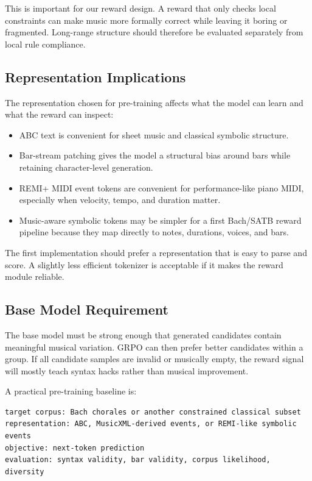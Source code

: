 \documentclass[11pt]{article}
\begin{document}
This is important for our reward design. A reward that only checks local
constraints can make music more formally correct while leaving it boring or
fragmented. Long-range structure should therefore be evaluated separately from
local rule compliance.

\subsection{Representation Implications}

The representation chosen for pre-training affects what the model can learn and
what the reward can inspect:

\begin{itemize}[leftmargin=*]
  \item ABC text is convenient for sheet music and classical symbolic structure.
  \item Bar-stream patching gives the model a structural bias around bars while
  retaining character-level generation.
  \item REMI+ MIDI event tokens are convenient for performance-like piano MIDI,
  especially when velocity, tempo, and duration matter.
  \item Music-aware symbolic tokens may be simpler for a first Bach/SATB reward
  pipeline because they map directly to notes, durations, voices, and bars.
\end{itemize}

The first implementation should prefer a representation that is easy to parse and
score. A slightly less efficient tokenizer is acceptable if it makes the reward
module reliable.

\subsection{Base Model Requirement}

The base model must be strong enough that generated candidates contain meaningful
musical variation. GRPO can then prefer better candidates within a group. If all
candidate samples are invalid or musically empty, the reward signal will mostly
teach syntax hacks rather than musical improvement.

A practical pre-training baseline is:

\begin{verbatim}
target corpus: Bach chorales or another constrained classical subset
representation: ABC, MusicXML-derived events, or REMI-like symbolic events
objective: next-token prediction
evaluation: syntax validity, bar validity, corpus likelihood, diversity
\end{verbatim}
\end{document}
